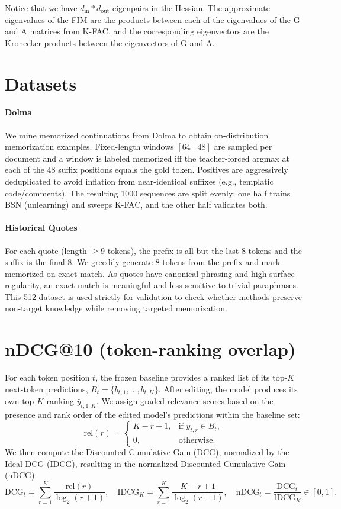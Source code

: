\documentclass{article} %
\newcommand{\matr}[1]{\ensuremath{\bm{\mathrm{#1}}}}
\begin{document}
Notice that we have $d_{\text{in}} * d_{\text{out}}$ eigenpairs in the Hessian. The approximate eigenvalues of the FIM are the products between each of the eigenvalues of the \matr{G} and \matr{A} matrices from K-FAC, and the corresponding eigenvectors are the Kronecker products between the eigenvectors of \matr{G} and \matr{A}.

\section{Datasets}
\label{sec:datasets}

\paragraph{Dolma}
We mine memorized continuations from Dolma to obtain on-distribution memorization examples. Fixed-length windows $[64 \mid 48]$ are sampled per document and a window is labeled memorized iff the teacher-forced argmax at each of the $48$ suffix positions equals the gold token. Positives are aggressively deduplicated to avoid inflation from near-identical suffixes (e.g., templatic code/comments). The resulting 1000 sequences are split evenly: one half trains BSN (unlearning) and sweeps K-FAC, and the other half validates both. 

\paragraph{Historical Quotes}
For each quote (length $\ge 9$ tokens), the prefix is all but the last $8$
tokens and the suffix is the final $8$. We greedily generate $8$ tokens from
the prefix and mark memorized on exact match. As quotes have canonical phrasing and high surface regularity, an exact-match is meaningful and less sensitive to trivial paraphrases. This 512 dataset is used strictly for validation to check whether methods preserve non-target knowledge while removing targeted memorization.

\section{nDCG@10 (token-ranking overlap)}
For each token position $t$, the frozen baseline provides a ranked list of its top-$K$ next-token predictions, $B_t = \{b_{t,1}, \dots, b_{t,K}\}$. After editing, the model produces its own top-$K$ ranking $\hat{y}_{t,1:K}$. We assign graded relevance scores based on the presence and rank order of the edited model's predictions within the baseline set:
\[
\mathrm{rel}(r) = 
\begin{cases}
K - r + 1, & \text{if } \hat{y}_{t,r} \in B_t, \\
0, & \text{otherwise.}
\end{cases}
\]
We then compute the Discounted Cumulative Gain (DCG), normalized by the Ideal DCG (IDCG), resulting in the normalized Discounted Cumulative Gain (nDCG):
\[
\mathrm{DCG}_t = \sum_{r=1}^{K} \frac{\mathrm{rel}(r)}{\log_2(r + 1)},\quad
\mathrm{IDCG}_K = \sum_{r=1}^{K} \frac{K - r + 1}{\log_2(r + 1)},\quad
\mathrm{nDCG}_t = \frac{\mathrm{DCG}_t}{\mathrm{IDCG}_K} \in [0,1].
\]
\end{document}
